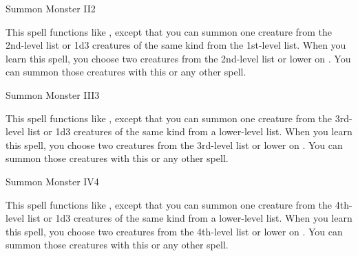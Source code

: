 \begin{spellsection}{Summon Monster II}{2}
\begin{spellheader}
\end{spellheader}
\begin{spellcontent}
    \spelleffect This spell functions like , except that you can summon one creature from the 2nd-level list or 1d3 creatures of the same kind from the 1st-level list. When you learn this spell, you choose two creatures from the 2nd-level list or lower on . You can summon those creatures with this or any other  spell.
    \spelldur \durshort \dismissable
\end{spellcontent}
\begin{spellfooter}
\end{spellfooter}
\end{spellsection}

\begin{spellsection}{Summon Monster III}{3}
\begin{spellheader}
\end{spellheader}
\begin{spellcontent}
    \spelleffect This spell functions like , except that you can summon one creature from the 3rd-level list or 1d3 creatures of the same kind from a lower-level list. When you learn this spell, you choose two creatures from the 3rd-level list or lower on . You can summon those creatures with this or any other  spell.
    \spelldur \durshort \dismissable
\end{spellcontent}
\begin{spellfooter}
\end{spellfooter}
\end{spellsection}

\begin{spellsection}{Summon Monster IV}{4}
\begin{spellheader}
\end{spellheader}
\begin{spellcontent}
    \spelleffect This spell functions like , except that you can summon one creature from the 4th-level list or 1d3 creatures of the same kind from a lower-level list. When you learn this spell, you choose two creatures from the 4th-level list or lower on . You can summon those creatures with this or any other  spell.
    \spelldur \durshort \dismissable
\end{spellcontent}
\begin{spellfooter}
\end{spellfooter}
\end{spellsection}

